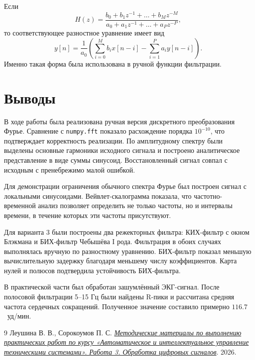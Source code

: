 \documentclass[a4paper,12pt]{article}
\begin{document}
Если
\[
    H(z)=\frac{b_0+b_1z^{-1}+\ldots+b_Mz^{-M}}{a_0+a_1z^{-1}+\ldots+a_Pz^{-P}},
\]
то соответствующее разностное уравнение имеет вид
\[
    y[n]=\frac{1}{a_0}\left(\sum_{i=0}^{M} b_i x[n-i]-\sum_{i=1}^{P} a_i y[n-i]\right).
\]
Именно такая форма была использована в ручной функции фильтрации.

\section{Выводы}

В ходе работы была реализована ручная версия дискретного преобразования Фурье. Сравнение с \texttt{numpy.fft} показало расхождение порядка $10^{-10}$, что подтверждает корректность реализации. По амплитудному спектру были выделены основные гармоники исходного сигнала и построено аналитическое представление в виде суммы синусоид. Восстановленный сигнал совпал с исходным с пренебрежимо малой ошибкой.

Для демонстрации ограничения обычного спектра Фурье был построен сигнал с локальными синусоидами. Вейвлет-скалограмма показала, что частотно-временной анализ позволяет определить не только частоты, но и интервалы времени, в течение которых эти частоты присутствуют.

Для варианта 3 были построены два режекторных фильтра: КИХ-фильтр с окном Блэкмана и БИХ-фильтр Чебышёва I рода. Фильтрация в обоих случаях выполнялась вручную по разностному уравнению. БИХ-фильтр показал меньшую вычислительную задержку благодаря меньшему числу коэффициентов. Карта нулей и полюсов подтвердила устойчивость БИХ-фильтра.

В практической части был обработан зашумлённый ЭКГ-сигнал. После полосовой фильтрации 5--15 Гц были найдены R-пики и рассчитана средняя частота сердечных сокращений. Полученное значение составило примерно $116.7$~уд/мин.

\begin{thebibliography}{9}
Леушина В. В., Сорокоумов П. С. \href{https://drive.google.com/file/d/1_ynRAScdyAZE_pU9GG6RBBCch2E7XNu5/view?usp=drive_link}{\textit{Методические материалы по выполнению практических работ по курсу «Автоматическое и интеллектуальное управление техническими системами». Работа 3. Обработка цифровых сигналов}}. 2026.
\end{thebibliography}
\end{document}

